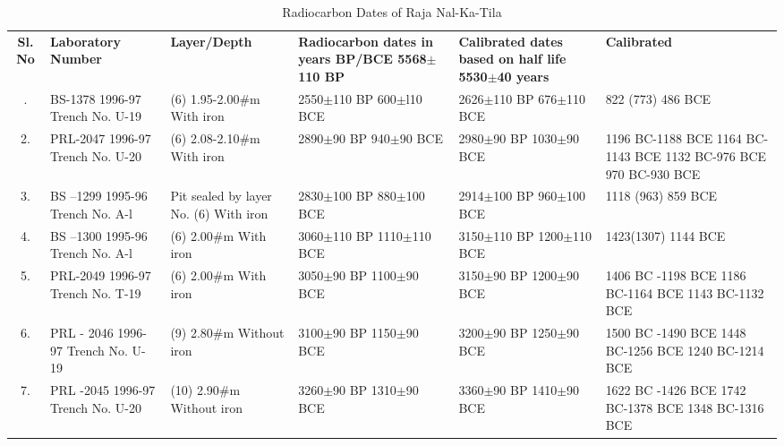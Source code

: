 {{\setlength\tabcolsep{2pt}
{\fontsize{7}{9}\selectfont
\begin{longtable}{|c|p{1.8cm}|p{1.5cm}|p{1.5cm}|p{1.5cm}|p{1.8cm}|}
\captionsetup{font=footnotesize}
\caption{Radiocarbon Dates of Raja Nal-Ka-Tila}\label{table III.2}\\
\hline
\multicolumn{1}{|m{.5cm}|}{\textbf{Sl. No}} &\multicolumn{1}{m{1.8cm}|}{\centering \textbf{Laboratory Number}}&\multicolumn{1}{m{1.5cm}|}{\centering \textbf{Layer/Depth}}&\multicolumn{1}{m{1.5cm}|}{\centering \textbf{Radiocarbon dates in years BP/BCE 5568$\pm$110 BP}}&\multicolumn{1}{m{1.5cm}|}{\centering \textbf{Calibrated dates based on half life 5530$\pm$40 years}} & \multicolumn{1}{m{1.8cm}|}{\centering \textbf{Calibrated}}\\
\endfirsthead
\hline
\endhead
\hline
\endfoot
\hline
1. & BS-1378 1996-97 Trench No. U-19 & (6) 1.95-2.00$\#$m With iron & 2550$\pm$110 BP 600$\pm$l10 BCE & 2626$\pm$110 BP 676$\pm$110 BCE & 822 (773) 486 BCE\\
2. & PRL-2047 1996-97 Trench No. U-20 & (6) 2.08-2.10$\#$m With iron & 2890$\pm$90 BP 940$\pm$90 BCE & 2980$\pm$90 BP 1030$\pm$90 BCE & 1196 BC-1188 BCE 1164 BC-1143 BCE 1132 BC-976 BCE 970 BC-930 BCE\\
3. & BS –1299 1995-96 Trench No. A-l & Pit sealed by layer No. (6) With iron & 2830$\pm$100 BP 880$\pm$100 BCE & 2914$\pm$100 BP 960$\pm$100 BCE & 1118 (963) 859 BCE\\
4. & BS –1300 1995-96 Trench No. A-l & (6) 2.00\#m With iron & 3060$\pm$110 BP 1110$\pm$110 BCE & 3150$\pm$110 BP 1200$\pm$110 BCE & 1423(1307) 1144 BCE\\
5. & PRL-2049 1996-97 Trench No. T-19 & (6) 2.00\#m With iron & 3050$\pm$90 BP 1100$\pm$90 BCE & 3150$\pm$90 BP 1200$\pm$90 BCE & 1406 BC -1198 BCE 1186 BC-1164 BCE 1143 BC-1132 BCE\\
6. & PRL - 2046 1996-97 Trench No. U-19 & (9) 2.80\#m Without iron & 3100$\pm$90 BP 1150$\pm$90 BCE & 3200$\pm$90 BP 1250$\pm$90 BCE & 1500 BC -1490 BCE 1448 BC-1256 BCE 1240 BC-1214 BCE\\
7. & PRL -2045 1996-97 Trench No. U-20 & (10) 2.90\#m Without iron & 3260$\pm$90 BP 1310$\pm$90 BCE & 3360$\pm$90 BP 1410$\pm$90 BCE & 1622 BC -1426 BCE 1742 BC-1378 BCE 1348 BC-1316 BCE\\
\end{longtable}
}}


}
